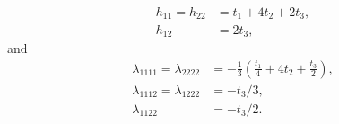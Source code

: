 \documentclass[aps,prb,twocolumn,letterpaper,twoside,nobalancelastpage,groupedaddress,amsmath,amssymb,floatfix,citeautoscript]{revtex4-1}
\begin{document}
\begin{align*}
h_{11} = h_{22} &= t_1 + 4t_2 + 2t_3,\\
h_{12} &= 2t_3,
\end{align*}
and 
\begin{align*}
\lambda_{1111} = \lambda_{2222} &= -\frac{1}{3}\left(\frac{t_1}{4} + 4t_2 + \frac{t_3}{2} \right),\\
\lambda_{1112}  = \lambda_{1222} &= -t_3/3,\\
\lambda_{1122} &= -t_3/2.
\end{align*}




\end{document}
